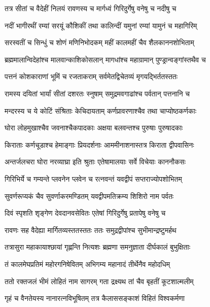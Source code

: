 \twolineshloka
{तत्र सीतां च वैदेहीं निलयं रावणस्य च}
{मार्गध्वं गिरिदुर्गेषु वनेषु च नदीषु च} %

\twolineshloka
{नदीं भागीरथीं रम्यां सरयूं कौशिकीं तथा}
{कालिन्दीं यमुनां रम्यां यामुनं च महागिरिम्} %

\twolineshloka
{सरस्वतीं च सिन्धुं च शोणं मणिनिभोदकम्}
{महीं कालमहीं चैव शैलकाननशोभिताम्} %

\twolineshloka
{ब्रह्ममालान्विदेहांश्च मालवान्काशिकोसलान्}
{मागधांश्च महाग्रामान् पुण्ड्रान्वङ्गांस्तथैव च} %

\twolineshloka
{पत्तनं कोशकाराणां भूमिं च रजताकराम्}
{सर्वमेतद्विचेतव्यं मृगयद्भिर्ततस्ततः} %

\twolineshloka
{रामस्य दयितां भार्यां सीतां दशरतः स्नुषाम्}
{समुद्रमवगाढांश्च पर्वतान् पत्तनानि च} %

\twolineshloka
{मन्दरस्य च ये कोटिं संश्रिताः केचिदायताम्}
{कर्णप्रावरणाश्चैव तथा चाप्योष्ठकर्णकाः} %

\twolineshloka
{घोरा लोहमुखाश्चैव जवनाश्चैकपादकाः}
{अक्षया बलवन्तश्च पुरुषाः पुरुषादकाः} %

\twolineshloka
{किराताः कर्णचूडाश्च हेमाङ्गाः प्रियदर्शनाः}
{आममीनाशनास्तत्र किराता द्वीपवासिनः} %

\twolineshloka
{अन्तर्जलचरा घोरा नरव्याघ्रा इति श्रुताः}
{एतेषामालयाः सर्वे विचेयाः काननौकसः} %

\twolineshloka
{गिरिभिर्ये च गम्यन्ते प्लवनेन प्लवेन च}
{रत्नवन्तं यवद्वीपं सप्तराज्योपशोभितम्} %

\twolineshloka
{सुवर्णरूप्यकं चैव सुवर्णाकरमण्डितम्}
{यवद्वीपमतिक्रम्य शिशिरो नाम पर्वतः} %

\twolineshloka
{दिवं स्पृशति शृङ्गेण देवदानवसेवितः}
{एतेषां गिरिदुर्गेषु प्रतापेषु वनेषु च} %

\twolineshloka
{रावणः सह वैदेह्या मार्गितव्यस्ततस्ततः}
{ततः समुद्रद्वीपांश्च सुभीमान्द्रष्टुमर्हथ} %

\twolineshloka
{तत्रासुरा महाकायाश्छायां गृह्णन्ति नित्यशः}
{ब्रह्मणा समनुज्ञाता दीर्घकालं बुभुक्षिताः} %

\twolineshloka
{तं कालमेघप्रतिमं महोरगनिषेवितम्}
{अभिगम्य महानादं तीर्थेनैव महोदधिम्} %

\twolineshloka
{ततो रक्तजलं भीमं लोहितं नाम सागरम्}
{गता द्रक्ष्यथ तां चैव बृहतीं कूटशाल्मलीम्} %

\twolineshloka
{गृहं च वैनतेयस्य नानारत्नविभूषितम्}
{तत्र कैलाससङ्काशं विहितं विश्वकर्मणा} %

